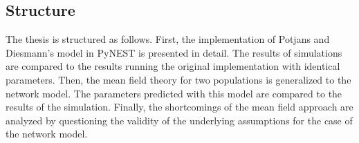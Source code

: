 \subsection{Structure}
The thesis is structured as follows. First, the implementation of Potjans and 
Diesmann's model in PyNEST is presented in detail. The results of simulations 
are compared to the results running the original implementation with identical 
parameters. Then, the mean field theory for two populations is generalized 
to the network model. The parameters predicted with this model are compared 
to the results of the simulation. Finally, the shortcomings of the mean field 
approach are analyzed by questioning the validity of the underlying assumptions
for the case of the network model. 



